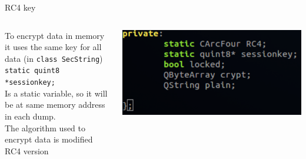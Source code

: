 \documentclass[compress]{beamer}
\begin{document}
\begin{frame}[fragile]{RC4 key}
  \begin{columns}[T]
    \begin{column}{.5\textwidth}
  To encrypt data in memory it uses the same key for all data (in \verb|class SecString|)\\
  \verb|static quint8 *sessionkey;|\\
  \vspace{0.1in}
  Is a static variable, so it will be at same memory address in each dump.\\
  \vspace{0.1in}
  The algorithm used to encrypt data is modified RC4 version
  \vspace{0.1in}
    \end{column}
    \begin{column}{.5\textwidth}
  \includegraphics[scale=0.5]{img/keypass_secstring.eps}
    \end{column}
  \end{columns}
\end{frame}
\end{document}
